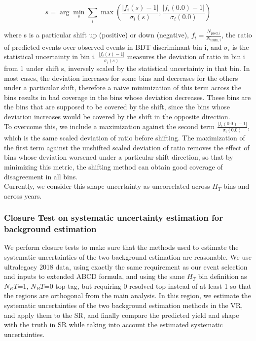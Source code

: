 \documentclass[twoside]{article}
\begin{document}
\[
s = \arg\min_s \sum_i \max\left(\frac{|f_i(s) - 1|}{\sigma_i(s)}, \frac{|f_i(0.0) - 1|}{\sigma_i(0.0)}\right)
\]

where s is a particular shift up (positive) or down (negative), $f_i = \frac{N_{\text{pred}, i}}{N_{\text{truth}, i}}$, the ratio of predicted events over observed events in BDT discriminant bin i, and $\sigma_i$ is the statistical uncertainty in bin i. $\frac{|f_i(s) - 1|}{\sigma_i(s)}$ measures the deviation of ratio in bin i from 1 under shift s, inversely scaled by the statistical uncertainty in that bin. In most cases, the deviation increases for some bins and decreases for the others under a particular shift, therefore a naive minimization of this term across the bins results in bad coverage in the bins whose deviation decreases. These bins are the bins that are supposed to be covered by the shift, since the bins whose deviation increases would be covered by the shift in the opposite direction.\\ 

To overcome this, we include a maximization against the second term
$\frac{|f_i(0.0) - 1|}{\sigma_i(0.0)}$, which is the same scaled deviation of ratio before shifting. The maximization of the first term against the unshifted scaled deviation of ratio removes the effect of bins whose deviation worsened under a particular shift direction, so that by minimizing this metric, the shifting method can obtain good coverage of disagreement in all bins.\\

Currently, we consider this shape uncertainty as uncorrelated across $H_T$ bins and across years.



\subsubsection{Closure Test on systematic uncertainty estimation for background estimation}

We perform closure tests to make sure that the methods used to estimate the systematic uncertainties of the two background estimation are reasonable. We use ultralegacy 2018 data, using exactly the same requirement as our event selection and inputs to extended ABCD formula, and using the same $H_T$ bin definition as $N_RT$=1, $N_BT$=0 top-tag, but requiring 0 resolved top instead of at least 1 so that the regions are orthogonal from the main analysis. In this region, we estimate the systematic uncertainties of the two background estimation methods in the VR, and apply them to the SR, and finally compare the predicted yield and shape with the truth in SR while taking into account the estimated systematic uncertainties.\\
\end{document}
